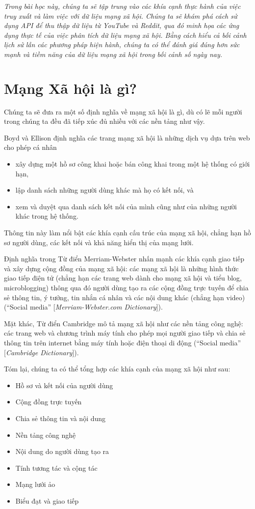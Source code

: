 \emph{Trong bài học này, chúng ta sẽ tập trung vào các khía cạnh thực hành của việc truy xuất và làm việc với dữ liệu mạng xã hội. Chúng ta sẽ khám phá cách sử dụng API để thu thập dữ liệu từ YouTube và Reddit, qua đó minh họa các ứng dụng thực tế của việc phân tích dữ liệu mạng xã hội. Bằng cách hiểu cả bối cảnh lịch sử lẫn các phương pháp hiện hành, chúng ta có thể đánh giá đúng hơn sức mạnh và tiềm năng của dữ liệu mạng xã hội trong bối cảnh số ngày nay.}

\section{Mạng Xã hội là gì?}

Chúng ta sẽ đưa ra một số định nghĩa về mạng xã hội là gì, dù có lẽ mỗi người trong chúng ta đều đã tiếp xúc đủ nhiều với các nền tảng như vậy.

Boyd và Ellison định nghĩa các trang mạng xã hội là những dịch vụ dựa trên web cho phép cá nhân
\begin{itemize}
  \item xây dựng một hồ sơ công khai hoặc bán công khai trong một hệ thống có giới hạn,
  \item lập danh sách những người dùng khác mà họ có kết nối, và
  \item xem và duyệt qua danh sách kết nối của mình cũng như của những người khác trong hệ thống.
\end{itemize}
Thông tin này làm nổi bật các khía cạnh cấu trúc của mạng xã hội, chẳng hạn hồ sơ người dùng, các kết nối và khả năng hiển thị của mạng lưới.

Định nghĩa trong Từ điển Merriam-Webster nhấn mạnh các khía cạnh giao tiếp và xây dựng cộng đồng của mạng xã hội: các mạng xã hội là những hình thức giao tiếp điện tử (chẳng hạn các trang web dành cho mạng xã hội và tiểu blog, microblogging) thông qua đó người dùng tạo ra các cộng đồng trực tuyến để chia sẻ thông tin, ý tưởng, tin nhắn cá nhân và các nội dung khác (chẳng hạn video) (``Social media'' [\emph{Merriam-Webster.com Dictionary}]).

Mặt khác, Từ điển Cambridge mô tả mạng xã hội như các nền tảng công nghệ: các trang web và chương trình máy tính cho phép mọi người giao tiếp và chia sẻ thông tin trên internet bằng máy tính hoặc điện thoại di động (``Social media'' [\emph{Cambridge Dictionary}]).

Tóm lại, chúng ta có thể tổng hợp các khía cạnh của mạng xã hội như sau:
\begin{itemize}
  \item Hồ sơ và kết nối của người dùng
  \item Cộng đồng trực tuyến
  \item Chia sẻ thông tin và nội dung
  \item Nền tảng công nghệ
  \item Nội dung do người dùng tạo ra
  \item Tính tương tác và cộng tác
  \item Mạng lưới ảo
  \item Biểu đạt và giao tiếp
\end{itemize}

